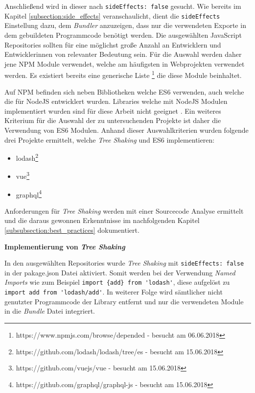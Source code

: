 Anschließend wird in dieser nach \lstinline{sideEffects: false} gesucht. Wie bereits im Kapitel \ref{subsection:side_effects} veranschaulicht, dient die \lstinline{sideEffects} Einstellung dazu, dem \textit{Bundler} anzuzeigen, dass nur die verwendeten Exporte in dem gebuildeten Programmcode benötigt werden.
Die ausgewählten JavaScript Repositories sollten  für eine möglichst große Anzahl an Entwicklern und Entwicklerinnen von relevanter Bedeutung sein. Für die Auswahl werden daher jene NPM Module verwendet, welche am häufigsten in Webprojekten verwendet werden. Es existiert bereits eine generische Liste \footnote{https://www.npmjs.com/browse/depended - besucht am 06.06.2018} die diese Module beinhaltet.

Auf NPM befinden sich neben Bibliotheken welche ES6 verwenden, auch welche die für NodeJS entwicklert wurden. Libraries welche mit NodeJS Modulen implementiert wurden sind für diese Arbeit nicht geeignet \autocite{NodeJSModules}. Ein weiteres Kriterium für die Auswahl der zu untersuchenden Projekte ist daher die Verwendung von ES6 Modulen.
Anhand dieser Auswahlkriterien wurden folgende drei Projekte ermittelt, welche \textit{Tree Shaking} und ES6  implementieren:

\begin{itemize}
	\item{lodash\footnote{https://github.com/lodash/lodash/tree/es - besucht am 15.06.2018}}
	\item{vue\footnote{https://github.com/vuejs/vue - besucht am 15.06.2018}}
	\item{graphql\footnote{https://github.com/graphql/graphql-js - besucht am 15.06.2018}}
\end{itemize}

Anforderungen für \textit{Tree Shaking} werden mit einer Sourcecode Analyse ermittelt und die daraus gewonnen Erkenntnisse im nachfolgenden Kapitel \ref{subsubsection:best_practices} dokumentiert.

\textbf{Implementierung von \textit{Tree Shaking}}

In den ausgewählten Repositories wurde \textit{Tree Shaking} mit \lstinline{sideEffects: false} in der pakage.json Datei aktiviert. Somit werden bei der Verwendung \textit{Named Imports} wie zum Beispiel \lstinline|import {add} from 'lodash'|, diese aufgelöst zu \lstinline{import add from 'lodash/add'}. In weiterer Folge wird sämtlicher nicht genutzter Programmcode der Library entfernt und nur die verwendeten Module in die \textit{Bundle} Datei integriert.

